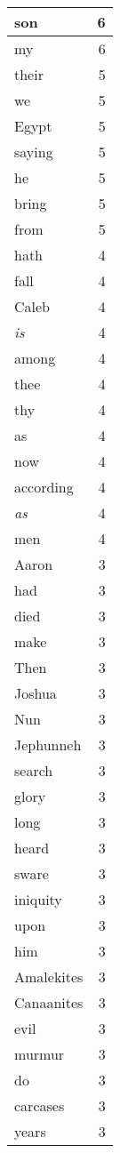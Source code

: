 \begin{center}
\begin{longtable}{l|r}
son & 6 \\ \hline
my & 6 \\ \hline
their & 5 \\ \hline
we & 5 \\ \hline
Egypt & 5 \\ \hline
saying & 5 \\ \hline
he & 5 \\ \hline
bring & 5 \\ \hline
from & 5 \\ \hline
hath & 4 \\ \hline
fall & 4 \\ \hline
Caleb & 4 \\ \hline
\emph{is} & 4 \\ \hline
among & 4 \\ \hline
thee & 4 \\ \hline
thy & 4 \\ \hline
as & 4 \\ \hline
now & 4 \\ \hline
according & 4 \\ \hline
\emph{as} & 4 \\ \hline
men & 4 \\ \hline
Aaron & 3 \\ \hline
had & 3 \\ \hline
died & 3 \\ \hline
make & 3 \\ \hline
Then & 3 \\ \hline
Joshua & 3 \\ \hline
Nun & 3 \\ \hline
Jephunneh & 3 \\ \hline
search & 3 \\ \hline
glory & 3 \\ \hline
long & 3 \\ \hline
heard & 3 \\ \hline
sware & 3 \\ \hline
iniquity & 3 \\ \hline
upon & 3 \\ \hline
him & 3 \\ \hline
Amalekites & 3 \\ \hline
Canaanites & 3 \\ \hline
evil & 3 \\ \hline
murmur & 3 \\ \hline
do & 3 \\ \hline
carcases & 3 \\ \hline
years & 3 \\ \hline

\end{longtable}
\end{center}
